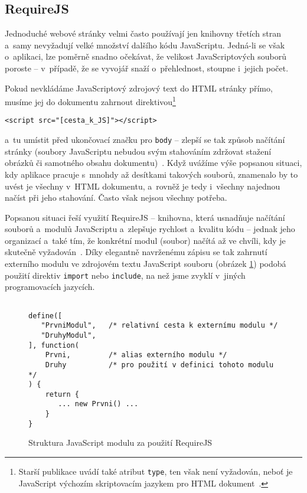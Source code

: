 		\subsection{\sf RequireJS}
			\label{requirejs}
			
			Jednoduché webové stránky velmi často používají jen knihovny třetích stran a~samy nevyžadují velké množství dalšího kódu JavaScriptu. Jedná-li se však o~aplikaci, lze poměrně snadno očekávat, že velikost JavaScriptových souborů poroste -- v~případě, že se vyvojář snaží o~přehlednost, stoupne i~jejich počet.

			\begin{samepage}
			Pokud nevkládáme JavaScriptový zdrojový text do HTML stránky přímo, musíme jej do dokumentu zahrnout direktivou\footnote{Starší publikace uvádí také atribut {\tt type}, ten však není vyžadován, neboť je JavaScript výchozím skriptovacím jazykem pro HTML dokument~\cite{w3schools-js}.}
			\begin{verbatim}<script src="[cesta_k_JS]"></script>\end{verbatim}
			\end{samepage}
			a~tu umístit před ukončovací značku pro {\tt body} -- zlepší se tak způsob načítání stránky (soubory JavaScriptu nebudou svým stahováním zdržovat stažení obráz\-ků či samotného obsahu dokumentu)~\cite{w3schools-js}. Když uvážíme výše popsanou situaci, kdy aplikace pracuje s~mnohdy až desítkami takových souborů, znamenalo by to uvést je všechny v~HTML dokumentu, a~rovněž je tedy i~všechny najednou načíst při jeho stahování. Často však nejsou všechny potřeba.

			Popsanou situaci řeší využití {\sf RequireJS} -- knihovna, která usnadňuje načítání souborů a~modulů JavaScriptu a~zlepšuje rychlost a~kvalitu kódu -- jednak jeho organizací a~také tím, že konkrétní modul (soubor) načítá až ve chvíli, kdy je skutečně vyžadován~\cite{requirejs}. Díky elegantně navrženému zápisu se tak zahrnutí externího modulu ve zdrojovém textu JavaScript souboru (obrázek \ref{img:requirejs_module}) podobá použití direktiv {\tt import} nebo {\tt include}, na než jsme zvyklí v~jiných programovacích jazycích.

			\begin{figure}[h!]
				\begin{verbatim}

define([
   "PrvniModul",   /* relativní cesta k externímu modulu */
   "DruhyModul",
], function(
    Prvni,         /* alias externího modulu */
    Druhy          /* pro použití v definici tohoto modulu */
) {
    return {
	   ... new Prvni() ...
    }
}\end{verbatim}
			\caption{Struktura JavaScript modulu za použití {\sf RequireJS}}
			\label{img:requirejs_module}
		\end{figure}
		
